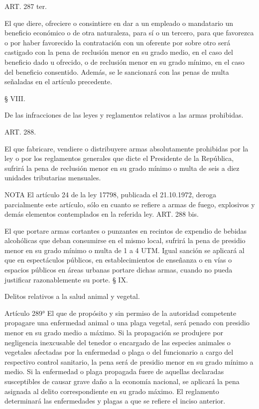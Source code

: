    
    ART. 287 ter.

    El que diere, ofreciere o consintiere en dar a un empleado o mandatario un beneficio económico o de otra naturaleza, para sí o un tercero, para que favorezca o por haber favorecido la contratación con un oferente por sobre otro será castigado con la pena de reclusión menor en su grado medio, en el caso del beneficio dado u ofrecido, o de reclusión menor en su grado mínimo, en el caso del beneficio consentido. Además, se le sancionará con las penas de multa señaladas en el artículo precedente.



    § VIII.

    De las infracciones de las leyes y reglamentos relativos a las armas prohibidas.










    ART. 288.

    El que fabricare, vendiere o distribuyere armas absolutamente prohibidas por la ley o por los reglamentos generales que dicte el Presidente de la República, sufrirá la pena de reclusión menor en su grado mínimo o multa de seis a diez unidades tributarias mensuales.









NOTA
      El artículo 24 de la ley 17798, publicada el 21.10.1972, deroga parcialmente este artículo, sólo en cuanto se refiere a armas de fuego, explosivos y demás elementos contemplados en la referida ley.
    ART. 288 bis.

    El que portare armas cortantes o punzantes en recintos de expendio de bebidas alcohólicas que deban consumirse en el mismo local, sufrirá la pena de presidio menor en su grado mínimo o multa de 1 a 4 UTM.
    Igual sanción se aplicará al que en espectáculos públicos, en establecimientos de enseñanza o en vías o espacios públicos en áreas urbanas portare dichas armas, cuando no pueda justificar razonablemente su porte.
    § IX.

    Delitos relativos a la salud animal y vegetal.


    Artículo 289° El que de propósito y sin permiso de la autoridad competente propagare una enfermedad animal o una plaga vegetal, será penado con presidio menor en su grado medio a máximo.
    Si la propagación se produjere por negligencia inexcusable del tenedor o encargado de las especies animales o vegetales afectadas por la enfermedad o plaga o del funcionario a cargo del respectivo control sanitario, la pena será de presidio menor en su grado mínimo a medio.
    Si la enfermedad o plaga propagada fuere de aquellas declaradas susceptibles de causar grave daño a la economía nacional, se aplicará la pena asignada al delito correspondiente en su grado máximo.
    El reglamento determinará las enfermedades y plagas a que se refiere el inciso anterior.




